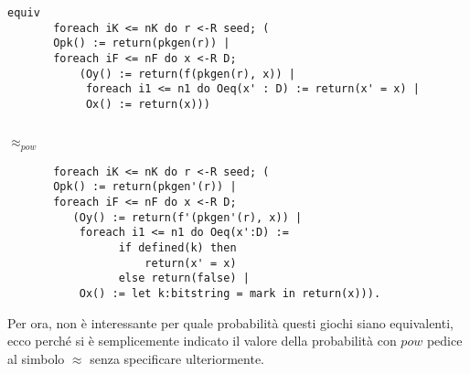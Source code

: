 \documentclass[a4paper,openright,twoside,12pt]{report}
\begin{document}
\begin{verbatim}
equiv 
       foreach iK <= nK do r <-R seed; (
       Opk() := return(pkgen(r)) |
       foreach iF <= nF do x <-R D;
           (Oy() := return(f(pkgen(r), x)) |
            foreach i1 <= n1 do Oeq(x' : D) := return(x' = x) |
            Ox() := return(x)))
   
\end{verbatim}
\texttt{$\approx _{pow}$} 
\begin{verbatim}       
       foreach iK <= nK do r <-R seed; (
       Opk() := return(pkgen'(r)) |
       foreach iF <= nF do x <-R D;
          (Oy() := return(f'(pkgen'(r), x)) |
           foreach i1 <= n1 do Oeq(x':D) :=
                 if defined(k) then 
                     return(x' = x) 
                 else return(false) |
           Ox() := let k:bitstring = mark in return(x))).
 \end{verbatim}
Per ora, non \`e interessante per quale probabilit\`a questi giochi siano equivalenti, ecco perch\'e si \`e semplicemente indicato il valore della probabilit\`a con $pow$ pedice al simbolo $\approx$ 
senza specificare ulteriormente.
\end{document}
